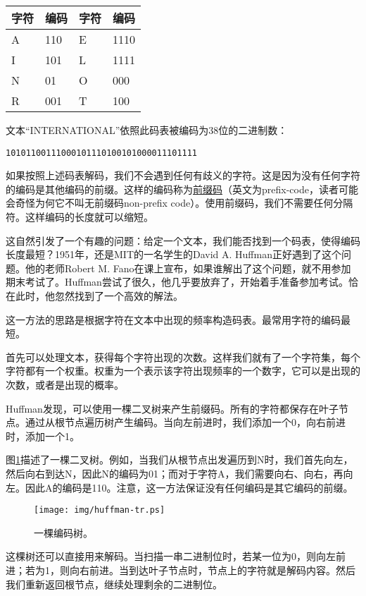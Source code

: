 \documentclass[UTF8]{article}
\begin{document}
\begin{tabular}{l|l||l|l}
字符 & 编码 & 字符 & 编码 \\
\hline
A & 110 & E & 1110 \\
I & 101 & L & 1111 \\
N & 01 & O & 000 \\
R & 001 & T & 100 \\
\hline
\end{tabular}

文本“INTERNATIONAL”依照此码表被编码为38位的二进制数：

\begin{verbatim}
10101100111000101110100101000011101111
\end{verbatim}

如果按照上述码表解码，我们不会遇到任何有歧义的字符。这是因为没有任何字符的编码是其他编码的前缀。这样的编码称为\underline{前缀码}（英文为prefix-code，读者可能会奇怪为何它不叫无前缀码non-prefix code）。使用前缀码，我们不需要任何分隔符。这样编码的长度就可以缩短。

这自然引发了一个有趣的问题：给定一个文本，我们能否找到一个码表，使得编码长度最短？1951年，还是MIT的一名学生的David A. Huffman正好遇到了这个问题\cite{Huffman}。他的老师Robert M. Fano在课上宣布，如果谁解出了这个问题，就不用参加期末考试了。Huffman尝试了很久，他几乎要放弃了，开始着手准备参加考试。恰在此时，他忽然找到了一个高效的解法。

这一方法的思路是根据字符在文本中出现的频率构造码表。最常用字符的编码最短。

首先可以处理文本，获得每个字符出现的次数。这样我们就有了一个字符集，每个字符都有一个权重。权重为一个表示该字符出现频率的一个数字，它可以是出现的次数，或者是出现的概率。

Huffman发现，可以使用一棵二叉树来产生前缀码。所有的字符都保存在叶子节点。通过从根节点遍历树产生编码。当向左前进时，我们添加一个0，向右前进时，添加一个1。

图\ref{fig:huffman-tr}描述了一棵二叉树。例如，当我们从根节点出发遍历到N时，我们首先向左，然后向右到达N，因此N的编码为01；而对于字符A，我们需要向右、向右，再向左。因此A的编码是110。注意，这一方法保证没有任何编码是其它编码的前缀。

\begin{figure}[htbp]
 \centering
 \texttt{[image: img/huffman-tr.ps]}
 \caption{一棵编码树。}
 \label{fig:huffman-tr}
\end{figure}

这棵树还可以直接用来解码。当扫描一串二进制位时，若某一位为0，则向左前进；若为1，则向右前进。当到达叶子节点时，节点上的字符就是解码内容。然后我们重新返回根节点，继续处理剩余的二进制位。
\end{document}
